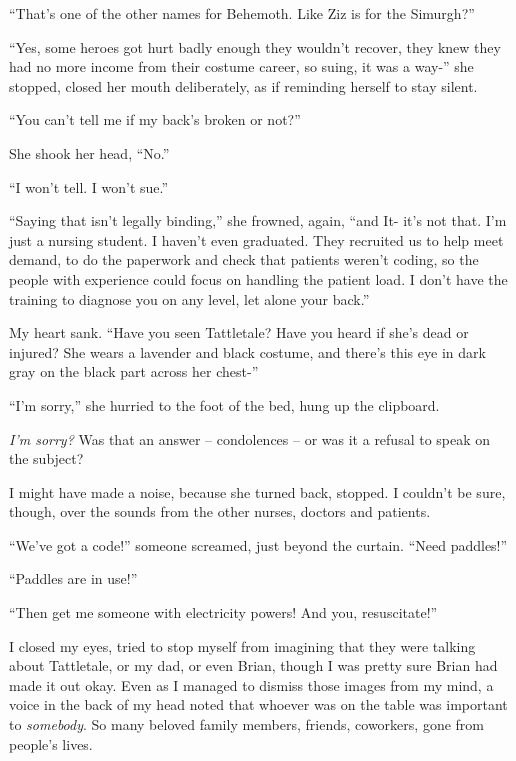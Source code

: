 ``That's one of the other names for Behemoth.  Like Ziz is for the Simurgh?''



``Yes, some heroes got hurt badly enough they wouldn't recover, they knew they had no more income from their costume career, so suing, it was a way-'' she stopped, closed her mouth deliberately, as if reminding herself to stay silent.



``You can't tell me if my back's broken or not?''



She shook her head, ``No.''



``I won't tell.  I won't sue.''



``Saying that isn't legally binding,'' she frowned, again, ``and It- it's not that.  I'm just a nursing student.  I haven't even graduated.  They recruited us to help meet demand, to do the paperwork and check that patients weren't coding, so the people with experience could focus on handling the patient load.  I don't have the training to diagnose you on any level, let alone your back.''



My heart sank.  ``Have you seen Tattletale?  Have you heard if she's dead or injured?  She wears a lavender and black costume, and there's this eye in dark gray on the black part across her chest-''



``I'm sorry,'' she hurried to the foot of the bed, hung up the clipboard.



\emph{I'm sorry?  }Was that an answer – condolences – or was it a refusal to speak on the subject?



I might have made a noise, because she turned back, stopped.  I couldn't be sure, though, over the sounds from the other nurses, doctors and patients.



``We've got a code!'' someone screamed, just beyond the curtain.  ``Need paddles!''



``Paddles are in use!''



``Then get me someone with electricity powers!  And you, resuscitate!''



I closed my eyes, tried to stop myself from imagining that they were talking about Tattletale, or my dad, or even Brian, though I was pretty sure Brian had made it out okay.  Even as I managed to dismiss those images from my mind, a voice in the back of my head noted that whoever was on the table was important to \emph{somebody}.  So many beloved family members, friends, coworkers, gone from people's lives.



